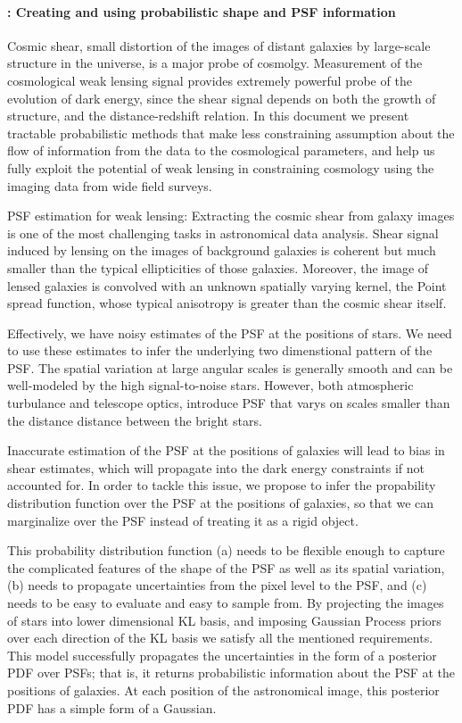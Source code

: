 \documentclass[12pt]{article}
\begin{document}
\paragraph{: Creating and using probabilistic shape and PSF information}

Cosmic shear, small distortion of the images of distant
galaxies by large-scale structure in the universe,
is a major probe of cosmolgy. Measurement of the cosmological
weak lensing signal provides extremely powerful probe of the
evolution of dark energy, since the shear signal depends on
both the growth of structure, and the distance-redshift relation.
In this document we present tractable probabilistic methods that
make less constraining assumption about the flow of information
from the data to the cosmological parameters, and help us fully exploit
the potential of weak lensing in  constraining cosmology using the
imaging data from wide field surveys.

PSF estimation for weak lensing:
Extracting the cosmic shear from galaxy images is one of the most challenging tasks in astronomical
data analysis. Shear signal induced by lensing on the images of background galaxies
is coherent but much smaller than the typical 
ellipticities of those galaxies. Moreover, the image of lensed galaxies is convolved with 
an unknown spatially varying kernel, the Point spread function, whose typical
anisotropy is greater than the cosmic shear itself.
 
Effectively, we have 
noisy estimates of the PSF at the positions of stars. We need to use these estimates to infer the
underlying two dimenstional pattern of the PSF. The spatial variation at large angular scales is 
generally smooth and can be well-modeled by the high signal-to-noise stars. However, both atmospheric
turbulance and telescope optics, introduce PSF that varys on scales smaller than the distance
distance between the bright stars. 

Inaccurate estimation of the PSF at the positions of galaxies will lead to bias in shear estimates,
which will propagate into the dark energy constraints if not accounted for. In order to
tackle this issue, we propose to infer the propability distribution function over the PSF
at the positions of galaxies, so that we can marginalize over the PSF instead of treating it 
as a rigid object.

This probability distribution function (a) needs to be flexible enough to capture the complicated 
features of the shape of the PSF as well as its spatial variation, (b) needs to propagate uncertainties
from the pixel level to the PSF, and (c) needs to be easy to evaluate and easy to sample from. By 
projecting the images of stars into lower dimensional KL basis, and imposing Gaussian Process priors 
over each direction of the KL basis we satisfy all the mentioned requirements. This model successfully propagates
the uncertainties in the form of a posterior PDF over PSFs; 
that is, it returns probabilistic information about the PSF at the positions of galaxies. At each
position of the astronomical image, this posterior PDF has a simple form of a Gaussian.
\end{document}

